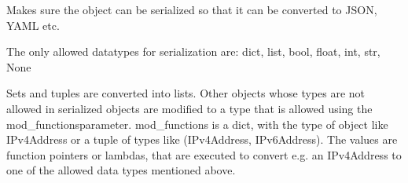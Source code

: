 \documentclass[a4paper,10pt,english]{sphinxmanual}
\begin{document}
\begin{fulllineitems}
\begin{fulllineitems}
\end{fulllineitems}


\begin{fulllineitems}
\label{\detokenize{fagus.fagus:fagus.fagus.Fagus.serialize}}
\pysigstartsignatures
{}
\pysigstopsignatures
\sphinxAtStartPar
Makes sure the object can be serialized so that it can be converted to JSON, YAML etc.

\sphinxAtStartPar
The only allowed data\sphinxhyphen{}types for serialization are: dict, list, bool, float, int, str, None

\sphinxAtStartPar
Sets and tuples are converted into lists. Other objects whose types are not allowed in serialized objects are
modified to a type that is allowed using the mod\_functions\sphinxhyphen{}parameter. mod\_functions is a dict, with the type
of object like IPv4Address or a tuple of types like (IPv4Address, IPv6Address). The values are function pointers
or lambdas, that are executed to convert e.g. an IPv4Address to one of the allowed data types mentioned above.


\end{fulllineitems}
\end{fulllineitems}
\end{document}
